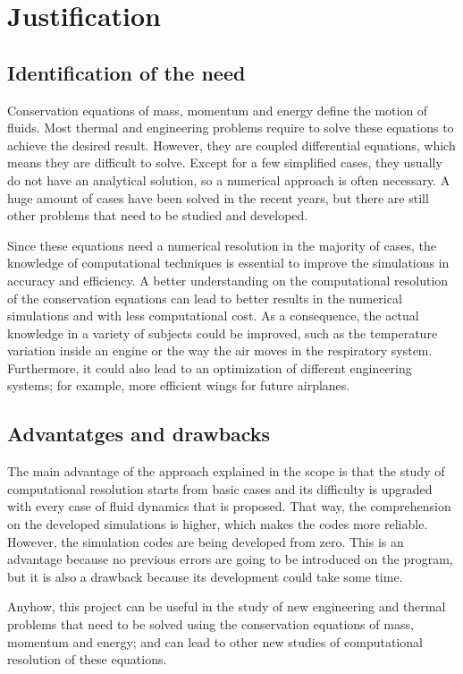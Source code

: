 \section{Justification}
\subsection{Identification of the need}
Conservation equations of mass, momentum and energy define the motion of fluids. Most thermal and engineering problems require to solve these equations to achieve the desired result. However, they are coupled differential equations, which means they are difficult to solve. Except for a few simplified cases, they usually do not have an analytical solution, so a numerical approach is often necessary. A huge amount of cases have been solved in the recent years, but there are still other problems that need to be studied and developed.

Since these equations need a numerical resolution in the majority of cases, the knowledge of computational techniques is essential to improve the simulations in accuracy and efficiency. A better understanding on the computational resolution of the conservation equations can lead to better results in the numerical simulations and with less computational cost. As a consequence, the actual knowledge in a variety of subjects could be improved, such as the temperature variation inside an engine or the way the air moves in the respiratory system. Furthermore, it could also lead to an optimization of different engineering systems; for example, more efficient wings for future airplanes.

\subsection{Advantatges and drawbacks}
The main advantage of the approach explained in the scope is that the study of computational resolution starts from basic cases and its difficulty is upgraded with every case of fluid dynamics that is proposed. That way, the comprehension on the developed simulations is higher, which makes the codes more reliable. However, the simulation codes are being developed from zero. This is an advantage because no previous errors are going to be introduced on the program, but it is also a drawback because its development could take some time.

Anyhow, this project can be useful in the study of new engineering and thermal problems that need to be solved using the conservation equations of mass, momentum and energy; and can lead to other new studies of computational resolution of these equations.